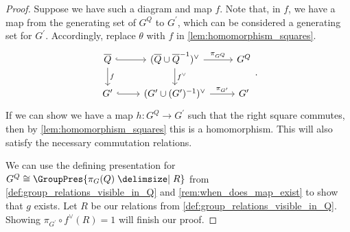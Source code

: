\begin{proof}
	Suppose we have such a diagram and map $f$. Note that, in $f$, we have a map from the generating set of $G^Q$ to $G^\prime$, which can be considered a generating set for $G^\prime$. Accordingly, replace $\theta$ with  $f$ in \cref{lem:homomorphism_squares}.
	\[
		\begin{tikzcd}
			\overline{Q} \ar[d, "f"] \ar[r, hook] & (\overline{Q} \cup \overline{Q}^{-1})^\vee \ar[d, "f^\vee"] \ar[r, "\pi_{G^Q}"] & G^Q \\
			G^\prime \ar[r, hook] & (G^\prime \cup (G^\prime)^{-1})^\vee \ar[r, "\pi_{G^\prime}"] & G^\prime
		\end{tikzcd}
		.\]
	If we can show we have a map $h \colon G^Q \to G^\prime$ such that the right square commutes, then by \cref{lem:homomorphism_squares} this is a homomorphism. This will also satisfy the necessary commutation relations.

	We can use the defining presentation for $G^Q \cong \GroupPres{\pi_G(Q) \relations R}$ from \cref{def:group_relations_visible_in_Q} and \cref{rem:when_does_map_exist} to show that $g$ exists. Let $R$ be our relations from \cref{def:group_relations_visible_in_Q}. Showing $\pi_{G^\prime} \circ f^\vee\left( R \right) = 1 $ will finish our proof.


\end{proof}
